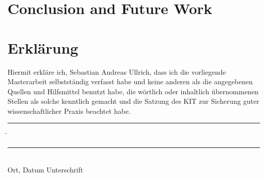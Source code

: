 \documentclass[12pt,a4paper,twoside]{article}
\begin{document}
\cleardoublepage
\pagestyle{fancy}
\fancyhf{}
\fancyhead[LE,RO]{\thepage}
\fancyhead[RE,LO]{\textit\leftmark}


\newpage

\newpage

\newpage

\newpage

\newpage

\newpage

\newpage

\newpage

\newpage
\section{Conclusion and Future Work}

\newpage



\cleardoublepage
\pagestyle{empty}
\section*{Erklärung}

  \vspace{20mm}
  Hiermit erkläre ich, Sebastian Andreas Ullrich, dass ich die vorliegende Masterarbeit selbst\-ständig
verfasst habe und keine anderen als die angegebenen Quellen und Hilfsmittel
benutzt habe, die wörtlich oder inhaltlich übernommenen Stellen als solche kenntlich gemacht und
die Satzung des KIT zur Sicherung guter wissenschaftlicher Praxis beachtet habe.
  \vspace{20mm}
  \begin{tabbing}
  \rule{4cm}{.4pt}\hspace{1cm} \= \rule{7cm}{.4pt} \\
 Ort, Datum \> Unterschrift
  \end{tabbing}
\end{document}
